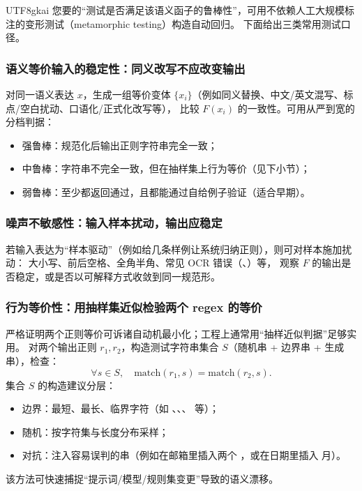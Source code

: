\documentclass[12pt]{article}
\newcommand{\code}[1]{\path{#1}}
\begin{document}
\begin{CJK*}{UTF8}{gkai}
您要的“测试是否满足该语义函子的鲁棒性”，可用不依赖人工大规模标注的变形测试（metamorphic testing）\cite{chen-metamorphic}构造自动回归。
下面给出三类常用测试口径。

\subsubsection{语义等价输入的稳定性：同义改写不应改变输出}

对同一语义表达 $x$，生成一组等价变体 $\{x_i\}$（例如同义替换、中文/英文混写、标点/空白扰动、口语化/正式化改写等），
比较 $F(x_i)$ 的一致性。可用从严到宽的分档判据：
\begin{itemize}
  \item 强鲁棒：规范化后输出正则字符串完全一致；
  \item 中鲁棒：字符串不完全一致，但在抽样集上行为等价（见下小节）；
  \item 弱鲁棒：至少都返回通过，且都能通过自给例子验证（适合早期）。
\end{itemize}

\subsubsection{噪声不敏感性：输入样本扰动，输出应稳定}

若输入表达为“样本驱动”（例如给几条样例让系统归纳正则），则可对样本施加扰动：
大小写、前后空格、全角半角、常见 OCR 错误（\code{O/0}、\code{l/1}）等，
观察 $F$ 的输出是否稳定，或是否以可解释方式收敛到同一规范形。

\subsubsection{行为等价性：用抽样集近似检验两个 regex 的等价}

严格证明两个正则等价可诉诸自动机最小化\cite{hopcroft-ullman}；工程上通常用“抽样近似判据”足够实用。
对两个输出正则 $r_1,r_2$，构造测试字符串集合 $S$（随机串 + 边界串 + 生成串），检查：
\[
\forall s\in S,\quad \mathrm{match}(r_1,s)=\mathrm{match}(r_2,s).
\]
集合 $S$ 的构造建议分层：
\begin{itemize}
  \item 边界：最短、最长、临界字符（如 \code{-}、\code{_}、\code{.}、\code{@} 等）；
  \item 随机：按字符集与长度分布采样；
  \item 对抗：注入容易误判的串（例如在邮箱里插入两个 \code{@}，或在日期里插入 \code{13} 月）。
\end{itemize}
该方法可快速捕捉“提示词/模型/规则集变更”导致的语义漂移。


\end{CJK*}
\end{document}
